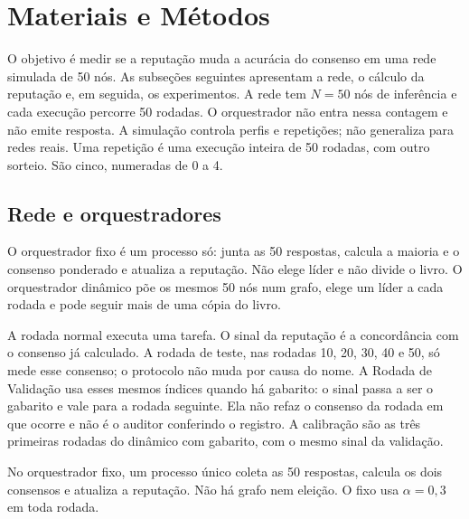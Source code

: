 \documentclass[12pt]{article}
\begin{document}
\section{Materiais e Métodos}
\label{sec:metodos}

O objetivo é medir se a reputação muda a acurácia do consenso em uma rede simulada de 50 nós. As subseções seguintes apresentam a rede, o cálculo da reputação e, em seguida, os experimentos. A rede tem $N=50$ nós de inferência e cada execução percorre 50 rodadas. O orquestrador não entra nessa contagem e não emite resposta. A simulação controla perfis e repetições; não generaliza para redes reais. Uma repetição é uma execução inteira de 50 rodadas, com outro sorteio. São cinco, numeradas de 0 a 4.

\subsection{Rede e orquestradores}

O orquestrador fixo é um processo só: junta as 50 respostas, calcula a maioria e o consenso ponderado e atualiza a reputação. Não elege líder e não divide o livro. O orquestrador dinâmico põe os mesmos 50 nós num grafo, elege um líder a cada rodada e pode seguir mais de uma cópia do livro.

A rodada normal executa uma tarefa. O sinal da reputação é a concordância com o consenso já calculado. A rodada de teste, nas rodadas 10, 20, 30, 40 e 50, só mede esse consenso; o protocolo não muda por causa do nome. A Rodada de Validação usa esses mesmos índices quando há gabarito: o sinal passa a ser o gabarito e vale para a rodada seguinte. Ela não refaz o consenso da rodada em que ocorre e não é o auditor conferindo o registro. A calibração são as três primeiras rodadas do dinâmico com gabarito, com o mesmo sinal da validação.

No orquestrador fixo, um processo único coleta as 50 respostas, calcula os dois consensos e atualiza a reputação. Não há grafo nem eleição. O fixo usa $\alpha = 0{,}3$ em toda rodada.
\end{document}
